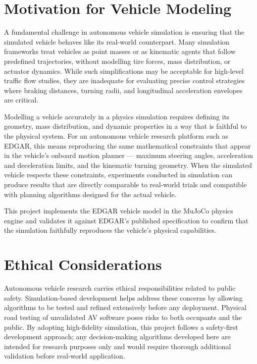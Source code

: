 \documentclass[a4paper,12pt]{report}
\begin{document}
\section{Motivation for Vehicle Modeling}

A fundamental challenge in autonomous vehicle simulation is ensuring that the
simulated vehicle behaves like its real-world counterpart. Many simulation
frameworks treat vehicles as point masses or as kinematic agents that follow
predefined trajectories, without modelling tire forces, mass distribution, or
actuator dynamics. While such simplifications may be acceptable for high-level
traffic flow studies, they are inadequate for evaluating precise control
strategies where braking distances, turning radii, and longitudinal acceleration
envelopes are critical.

Modelling a vehicle accurately in a physics simulation requires defining its
geometry, mass distribution, and dynamic properties in a way that is faithful
to the physical system. For an autonomous vehicle research platform such as
EDGAR, this means reproducing the same mathematical constraints that appear in
the vehicle's onboard motion planner — maximum steering angles, acceleration and
deceleration limits, and the kinematic turning geometry. When the simulated
vehicle respects these constraints, experiments conducted in simulation can
produce results that are directly comparable to real-world trials and compatible
with planning algorithms designed for the actual vehicle.

This project implements the EDGAR vehicle model in the MuJoCo physics engine
and validates it against EDGAR's published specification to confirm that the
simulation faithfully reproduces the vehicle's physical capabilities.

\section{Ethical Considerations}

Autonomous vehicle research carries ethical responsibilities related to public
safety. Simulation-based development helps address these concerns by allowing
algorithms to be tested and refined extensively before any deployment. Physical
road testing of unvalidated AV software poses risks to both occupants and the
public. By adopting high-fidelity simulation, this project follows a
safety-first development approach; any decision-making algorithms developed here
are intended for research purposes only and would require thorough additional
validation before real-world application.
\end{document}
